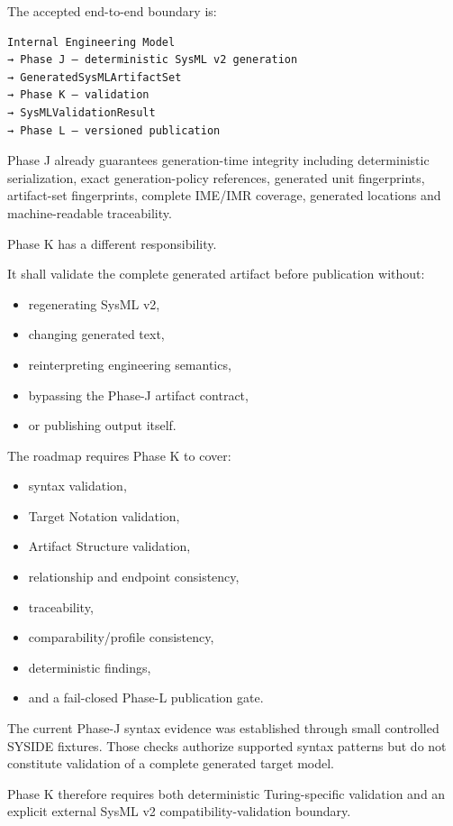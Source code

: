 The accepted end-to-end boundary is:

\begin{verbatim}
Internal Engineering Model
→ Phase J — deterministic SysML v2 generation
→ GeneratedSysMLArtifactSet
→ Phase K — validation
→ SysMLValidationResult
→ Phase L — versioned publication
\end{verbatim}

Phase J already guarantees generation-time integrity including deterministic serialization, exact generation-policy references, generated unit fingerprints, artifact-set fingerprints, complete IME/IMR coverage, generated locations and machine-readable traceability.

Phase K has a different responsibility.

It shall validate the complete generated artifact before publication without:

\begin{itemize}
\tightlist
\item
  regenerating SysML v2,
\item
  changing generated text,
\item
  reinterpreting engineering semantics,
\item
  bypassing the Phase-J artifact contract,
\item
  or publishing output itself.
\end{itemize}

The roadmap requires Phase K to cover:

\begin{itemize}
\tightlist
\item
  syntax validation,
\item
  Target Notation validation,
\item
  Artifact Structure validation,
\item
  relationship and endpoint consistency,
\item
  traceability,
\item
  comparability/profile consistency,
\item
  deterministic findings,
\item
  and a fail-closed Phase-L publication gate.
\end{itemize}

The current Phase-J syntax evidence was established through small controlled SYSIDE fixtures. Those checks authorize supported syntax patterns but do not constitute validation of a complete generated target model.

Phase K therefore requires both deterministic Turing-specific validation and an explicit external SysML v2 compatibility-validation boundary.

